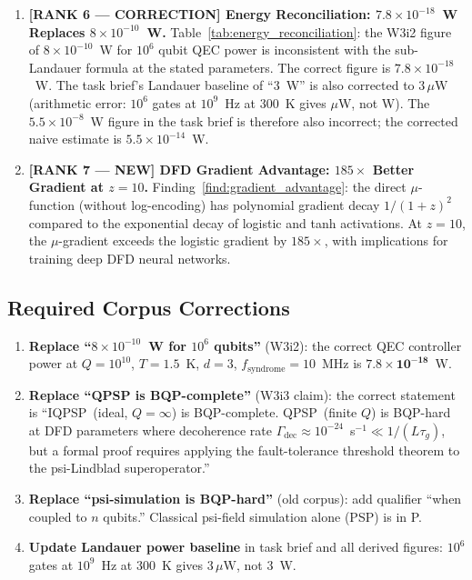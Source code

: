 \documentclass[11pt]{article}
\theoremstyle{definition}
\theoremstyle{remark}
\newcommand{\QPSP}{\textsc{QPSP}}
\newcommand{\IQPSP}{\textsc{IQPSP}}
\begin{document}
\begin{enumerate}
\item \textbf{[RANK 6 --- CORRECTION] Energy Reconciliation: $7.8\times10^{-18}$~W
  Replaces $8\times10^{-10}$~W.}
  Table~\ref{tab:energy_reconciliation}: the W3i2 figure of $8\times10^{-10}$~W
  for $10^6$ qubit QEC power is inconsistent with the sub-Landauer formula
  at the stated parameters. The correct figure is $7.8\times10^{-18}$~W.
  The task brief's Landauer baseline of ``3~W'' is also corrected to
  $3\,\mu\mathrm{W}$ (arithmetic error: $10^6$ gates at $10^9$~Hz at
  300~K gives $\mu$W, not W). The $5.5\times10^{-8}$~W figure in the
  task brief is therefore also incorrect; the corrected naive estimate
  is $5.5\times10^{-14}$~W.

\item \textbf{[RANK 7 --- NEW] DFD Gradient Advantage: $185\times$
  Better Gradient at $z=10$.}
  Finding~\ref{find:gradient_advantage}: the direct $\mu$-function
  (without log-encoding) has polynomial gradient decay $1/(1+z)^2$
  compared to the exponential decay of logistic and tanh activations.
  At $z=10$, the $\mu$-gradient exceeds the logistic gradient by $185\times$,
  with implications for training deep DFD neural networks.
\end{enumerate}

\subsection{Required Corpus Corrections}

\begin{enumerate}
\item \textbf{Replace ``$8\times10^{-10}$~W for $10^6$ qubits''} (W3i2):
  the correct QEC controller power at $Q=10^{10}$, $T=1.5$~K, $d=3$,
  $f_{\mathrm{syndrome}} = 10$~MHz is $\mathbf{7.8\times10^{-18}}$~W.

\item \textbf{Replace ``QPSP is BQP-complete''} (W3i3 claim): the correct
  statement is ``\IQPSP\ (ideal, $Q=\infty$) is BQP-complete.
  \QPSP\ (finite $Q$) is BQP-hard at DFD parameters where decoherence
  rate $\Gamma_{\mathrm{dec}} \approx 10^{-24}$~s$^{-1} \ll 1/(L\tau_g)$,
  but a formal proof requires applying the fault-tolerance threshold
  theorem to the psi-Lindblad superoperator.''

\item \textbf{Replace ``psi-simulation is BQP-hard''} (old corpus):
  add qualifier ``when coupled to $n$ qubits.'' Classical psi-field
  simulation alone (PSP) is in P.

\item \textbf{Update Landauer power baseline} in task brief and all
  derived figures: $10^6$ gates at $10^9$~Hz at 300~K gives
  $3\,\mu\mathrm{W}$, not 3~W.
\end{enumerate}
\end{document}
